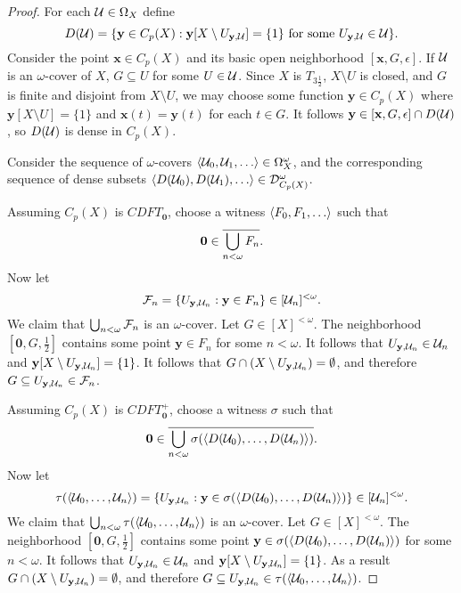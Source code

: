 \documentclass{amsart}
\renewcommand{\vec}{\mathbf}
\theoremstyle{plain}
\theoremstyle{definition}
\theoremstyle{remark}
\theoremstyle{plain}
\theoremstyle{definition}
\theoremstyle{remark}
\begin{document}
\begin{proof}
  For each \(\mathcal{U}\in\Omega_{X}\) define
  \[
    D(\mc U)
      =
    \{
      \vec y\in C_p(X)
    :
      \vec y[X\setminus U_{\vec y,\mc U}]=\{1\}
      \text{ for some }
      U_{\vec y,\mc U}\in\mc U
    \}
  .\]
  Consider the point \(\vec x\in C_p(X)\) and its basic open neighborhood
  \([\vec x,G,\epsilon]\). If \(\mathcal{U}\) is an \(\omega\)-cover
  of \(X\), \(G\subseteq U\)
  for some \(U\in\mathcal{U}\).
  Since \(X\) is
  \(T_{3\frac{1}{2}}\), \(X\setminus U\) is closed, and \(G\)
  is finite and disjoint from \(X\setminus U\),
  we may choose some function \(\vec y\in C_p(X)\) where
  \(\vec y[X\setminus U]=\{1\}\) and \(\vec x(t)=\vec y(t)\)
  for each \(t\in G\).
  It follows \(\vec y\in [\vec x,G,\epsilon]\cap D(\mc U)\), so \(D(\mathcal{U})\)
  is dense in \(C_p(X)\).

  Consider the sequence of \(\omega\)-covers
  \(\<\mc U_0,\mc U_1,\dots\>\in\Omega_X^\omega\), and the
  corresponding sequence of dense subsets
  \(\<D(\mc U_0),D(\mc U_1),\dots\>\in\mc D_{C_p(X)}^\omega\).

  Assuming \(C_p(X)\) is \(CDFT_{\vec 0}\), choose a witness
  \(\<F_0,F_1,\dots\>\) such that
  \[
    \vec 0 \in \cl{\bigcup_{n<\omega} F_n}
  .\]
  Now let
  \[
    \mc F_n
      =
    \{
      U_{\vec y,\mc U_n}
    :
      \vec y \in F_n
    \}
      \in
    [\mc U_n]^{<\omega}
  .\]
  We claim that \(\bigcup_{n<\omega}\mathcal{F}_n\) is an \(\omega\)-cover.
  Let \(G\in[X]^{<\omega}\). The neighborhood \([\vec 0,G,\frac{1}{2}]\)
  contains some point \(\vec y\in F_n\) for some \(n<\omega\). It follows
  that \(U_{\vec y,\mc U_n}\in\mc U_n\) and
  \(\vec y[X\setminus U_{\vec y,\mc U_n}]=\{1\}\). It follows that
  \(G\cap(X\setminus U_{\vec y,\mc U_n})=\emptyset\), and therefore
  \(G\subseteq U_{\vec y,\mc U_n}\in\mc F_n\).

  Assuming \(C_p(X)\) is \(CDFT_{\vec 0}^+\), choose a witness
  \(\sigma\) such that
  \[
    \vec 0
      \in
    \cl{\bigcup_{n<\omega} \sigma(\<D(\mc U_0),\dots,D(\mc U_n)\>)}
  .\]
  Now let
  \[
    \tau(\<\mc U_0,\dots,\mc U_n\>)
      =
    \{
      U_{\vec y,\mc U_n}
    :
      \vec y \in \sigma(\<D(\mc U_0),\dots,D(\mc U_n)\>)
    \}
      \in
    [\mc U_n]^{<\omega}
  .\]
  We claim that \(\bigcup_{n<\omega}\tau(\langle\mathcal{U}_0,\dots,\mathcal{U}_n\rangle)\)
  is an \(\omega\)-cover.
  Let \(G\in[X]^{<\omega}\). The neighborhood \([\vec 0,G,\frac{1}{2}]\)
  contains some point \(\vec y\in \sigma(\<D(\mc U_0),\dots,D(\mc U_n)\>)\)
  for some \(n<\omega\). It follows
  that \(U_{\vec y,\mc U_n}\in\mc U_n\) and
  \(\vec y[X\setminus U_{\vec y,\mc U_n}]=\{1\}\). As a result
  \(G\cap(X\setminus U_{\vec y,\mc U_n})=\emptyset\), and therefore
  \(G\subseteq U_{\vec y,\mc U_n}\in\mc \tau(\<\mc U_0,\dots,\mc U_n\>)\).


\end{proof}
\end{document}
